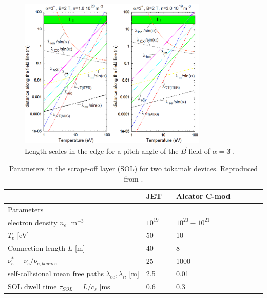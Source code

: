 \documentclass[11pt,titlepage]{report}
\newcommand{\ra}[1]{\renewcommand{\arraystretch}{#1}}
\begin{document}
\begin{figure}[h!]
  \centering
    \includegraphics[width=0.8\textwidth]{graphics/SOL_scales.eps}
  \caption{Length scales in the edge for a pitch angle of the $\vec{B}$-field of $\alpha = 3^{\circ}$.}
  \label{fig:SOL_scales}
\end{figure}

\begin{table}\centering
\ra{1.4}
\begin{tabular}{@{}llclclcl@{}}\toprule[2 pt]
&\multicolumn{1}{c}{JET} & \phantom{abc} & \multicolumn{1}{c}{Alcator C-mod} \\
\midrule
\phantom{a}Parameters & &&  \\
\phantom{a}electron density $n_e$ [$\text{m}^{-3}$]	&	$10^{19}$	&&	$10^{20} -10^{21}$       \\
\phantom{a}$T_e$ [eV]	&	50	&&	10 \\
\phantom{a}Connection length $L$ [m]         &	40	        &&	8	\\
\phantom{a}$\nu_e^* = \nu_e / \nu_{e,bounce}$	& 25    	&&	1000	\\
\phantom{a}self-collisional mean free paths $\lambda_{ee}, \lambda_{ii}$ [m]  &	2.5	        &&	0.01	\\
\phantom{a}SOL dwell time $\tau_{SOL} = L / c_s$ [ms]  &	0.6	        &&	0.3	\\
\bottomrule[2 pt]
\end{tabular}
\caption{Parameters in the scrape-off layer (SOL) for two tokamak devices. Reproduced from \cite[p.21]{Stangeby}.}
\label{tbl:Stangeby_SOL_scales}
\end{table}

\end{document}
